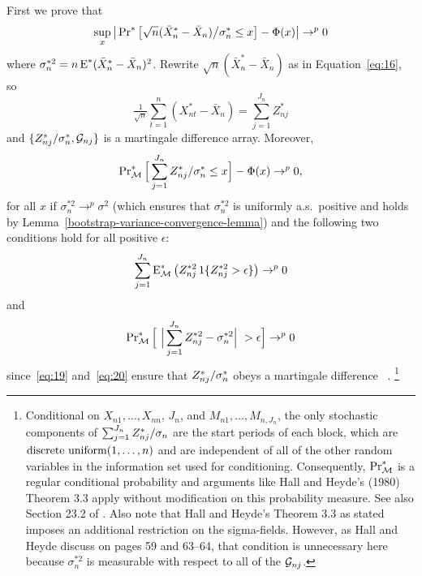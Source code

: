\documentclass[11pt]{article}
\begin{document}
{%
\newcommand{\Db}[1][j]{D_{n#1}^{*}}
\newcommand{\Zsum}{\sum_{j=1}^{J_n} \Zb / \sigma_n}
First we prove that
\begin{equation}\label{eq:37}
  \sup_x \big\lvert \operatorname{Pr}^{*}\big[
  \sqrt{n}(\bar X_{n}^{*} -  \bar X_n) \big/ \sigma_n^{*}
  \leq x \big] - \Phi(x) \big\rvert \to^p 0
\end{equation}
where $\sigma_n^{*2} = n \operatorname{E}^* (\bar X_n^* - \bar X_n)^2$.
Rewrite $\sqrt{n}(\bar X_{n}^{*} - \bar X_n)$ as in
Equation~\eqref{eq:16}, so
\begin{equation*}
  \tfrac{1}{\sqrt{n}} \sum_{t=1}^n (X_{nt}^* - \bar X_n) =
  \sum_{j=1}^{J_n} Z_{nj}^*
\end{equation*}
and $\{{Z^*_{n{j}}} / \sigma_n^*, \mathcal{G}_{nj}\}$ is a martingale difference
array. Moreover,
\begin{equation}
  \label{eq:18}
  \operatorname{Pr}_{\mathcal{M}}^{*} \Big[\sum_{j=1}^{J_n} {Z^*_{n{j}}} / \sigma_n^* \leq x \Big] - \Phi(x) \to^p 0,
\end{equation}
for all $x$ if $\sigma_n^{*2} \to^p \sigma^2$ (which ensures that
$\sigma_n^{*2}$ is uniformly a.s.\ positive and holds by
Lemma~\ref{bootstrap-variance-convergence-lemma}) and the following
two conditions hold for all positive $\epsilon$:
\begin{equation}
  \label{eq:19}
  \sum_{j=1}^{J_n} \operatorname{E}_{\mathcal{M}}^{*} \big(Z_{nj}^{*2} \operatorname{1}\{Z_{nj}^{*2}  >
  \epsilon\}\big) \to^p 0
\end{equation}
and
\begin{equation}
  \label{eq:20}
  \operatorname{Pr}_{\mathcal{M}}^{*}\Big[\ \Big|\sum_{j=1}^{J_n} Z_{nj}^{*2} - \sigma_n^{*2}
  \Big|\ > \epsilon \Big] \to^p 0
\end{equation}
since~\eqref{eq:19} and~\eqref{eq:20} ensure that ${Z^*_{n{j}}}/\sigma_n^*$ obeys
a martingale difference \clt\ \citep[e.g.][Theorem 3.3]{HaH:80}.%
\footnote{Conditional on $X_{n1},\dots,X_{nn}$, $J_n$, and
  $M_{n1},\dots,M_{n,J_n}$, the only stochastic components of $\Zsum$
  are the start periods of each block, which are
  $\operatorname{discrete\ uniform}(1,\dots,n)$ and are independent of all of the
  other random variables in the information set used for conditioning.
  Consequently, $\operatorname{Pr}_{\mathcal{M}}^*$ is a regular conditional probability and
  arguments like Hall and Heyde's (1980) Theorem 3.3
  apply without modification on this probability measure. See
  also Section 23.2 of \citet{Vaa:00}.
  Also note that Hall and Heyde's Theorem 3.3 as stated imposes an
  additional restriction on the sigma-fields. However, as Hall and
  Heyde discuss on pages 59 and 63--64, that condition is unnecessary
  here because $\sigma_n^{*2}$ is measurable with respect to
  all of the $\mathcal{G}_{nj}$.} %

}
\end{document}
